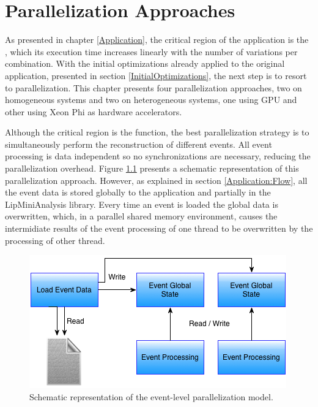 \chapter{Parallelization Approaches}
\label{ParallelizationApproaches}

As presented in chapter \ref{Application}, the critical region of the \tth application is the \ttDilepKinFit, which its execution time increases linearly with the number of variations per combination. With the initial optimizations already applied to the original application, presented in section \ref{InitialOptimizations}, the next step is to resort to parallelization. This chapter presents four parallelization approaches, two on homogeneous systems and two on heterogeneous systems, one using GPU and other using \intel Xeon Phi as hardware accelerators.

Although the critical region is the \ttDilepKinFit function, the best parallelization strategy is to simultaneously perform the reconstruction of different events. All event processing is data independent so no synchronizations are necessary, reducing the parallelization overhead. Figure \ref{fig:EventParallelization} presents a schematic representation of this parallelization approach. However, as explained in section \ref{Application:Flow}, all the event data is stored globally to the application and partially in the LipMiniAnalysis library. Every time an event is loaded the global data is overwritten, which, in a parallel shared memory environment, causes the intermidiate results of the event processing of one thread to be overwritten by the processing of other thread.

\begin{figure}[!htp]
	\begin{center}
		\includegraphics[scale=0.7]{../../common/img/2global_states_par.png}
		\caption{Schematic representation of the event-level parallelization model.}
		\label{fig:EventParallelization}
	\end{center}
\end{figure}

